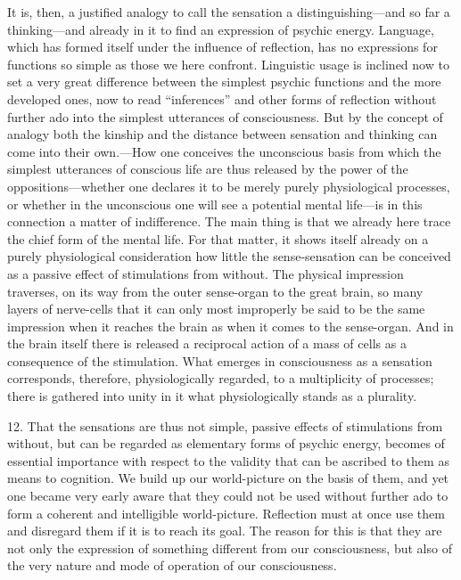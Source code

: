 \documentclass[12pt,a4paper]{book}
\newcommand{\opage}[1]{\marginnote{\footnotesize\textit{[#1]}}}
\begin{document}
It is, then, a justified analogy to call the sensation a
distinguishing---and so far a thinking---and already in it to find an
expression of psychic energy. Language, which has formed itself under the
influence of reflection, has no expressions for functions so simple as
those we here \opage{39}confront. Linguistic usage is inclined now to set a very
great difference between the simplest psychic functions and the more
developed ones, now to read ``inferences'' and other forms of reflection
without further ado into the simplest utterances of consciousness. But by
the concept of analogy both the kinship and the distance between
sensation and thinking can come into their own.---How one conceives the
unconscious basis from which the simplest utterances of conscious life
are thus released by the power of the oppositions---whether one declares
it to be merely purely physiological processes, or whether in the
unconscious one will see a potential mental life---is in this connection
a matter of indifference. The main thing is that we already here trace
the chief form of the mental life. For that matter, it shows itself
already on a purely physiological consideration how little the
sense-sensation can be conceived as a passive effect of stimulations from
without. The physical impression traverses, on its way from the outer
sense-organ to the great brain, so many layers of nerve-cells that it can
only most improperly be said to be the same impression when it reaches
the brain as when it comes to the sense-organ. And in the brain itself
there is released a reciprocal action of a mass of cells as a consequence
of the stimulation. What emerges in consciousness as a sensation
corresponds, therefore, physiologically regarded, to a multiplicity of
processes; there is gathered into unity in it what physiologically stands
as a plurality.

12. That the sensations are thus not simple, passive effects of
stimulations from without, but can be regarded as elementary forms of
psychic energy, becomes of essential importance with respect to the
validity that can be ascribed to them as means to cognition. We build up
our world-picture on the basis of them, and yet one became very early
aware that they could not be used without further ado to form a coherent
and intelligible world-picture. Reflection must at once use them and
disregard them if it is to reach its goal. The reason for this is that
they are not only the expression of something \opage{40}different from our
consciousness, but also of the very nature and mode of operation of our
consciousness.
\end{document}
